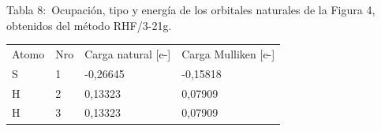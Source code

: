 \documentclass[]{article}
\begin{document}
{Tabla 8:}{~Ocupación, tipo y energía de los orbitales naturales de la
Figura 4, obtenidos del método RHF/3-21g.}

{}

\protect\hypertarget{t.2dff5057e1400861e8aca07e8a18d6d69613d450}{}{}\protect\hypertarget{t.8}{}{}

\begin{longtable}[]{@{}llll@{}}
\toprule
\begin{minipage}[t]{0.22\columnwidth}\raggedright\strut
{Atomo}\strut
\end{minipage} & \begin{minipage}[t]{0.22\columnwidth}\raggedright\strut
{Nro}\strut
\end{minipage} & \begin{minipage}[t]{0.22\columnwidth}\raggedright\strut
{Carga natural {[}e}{-}{{]}}\strut
\end{minipage} & \begin{minipage}[t]{0.22\columnwidth}\raggedright\strut
{Carga Mulliken {[}e}{-}{{]}}\strut
\end{minipage}\tabularnewline
\begin{minipage}[t]{0.22\columnwidth}\raggedright\strut
{S}\strut
\end{minipage} & \begin{minipage}[t]{0.22\columnwidth}\raggedright\strut
{1}\strut
\end{minipage} & \begin{minipage}[t]{0.22\columnwidth}\raggedright\strut
{-0}{,}{26645}\strut
\end{minipage} & \begin{minipage}[t]{0.22\columnwidth}\raggedright\strut
{-0}{,}{1581}{8}{~ }\strut
\end{minipage}\tabularnewline
\begin{minipage}[t]{0.22\columnwidth}\raggedright\strut
{H}\strut
\end{minipage} & \begin{minipage}[t]{0.22\columnwidth}\raggedright\strut
{2}\strut
\end{minipage} & \begin{minipage}[t]{0.22\columnwidth}\raggedright\strut
{0}{,}{13323}\strut
\end{minipage} & \begin{minipage}[t]{0.22\columnwidth}\raggedright\strut
{0}{,}{0790}{9}\strut
\end{minipage}\tabularnewline
\begin{minipage}[t]{0.22\columnwidth}\raggedright\strut
{H}\strut
\end{minipage} & \begin{minipage}[t]{0.22\columnwidth}\raggedright\strut
{3}\strut
\end{minipage} & \begin{minipage}[t]{0.22\columnwidth}\raggedright\strut
{0}{,}{13323}\strut
\end{minipage} & \begin{minipage}[t]{0.22\columnwidth}\raggedright\strut
{0}{,}{0790}{9}\strut
\end{minipage}\tabularnewline
\bottomrule
\end{longtable}
\end{document}
